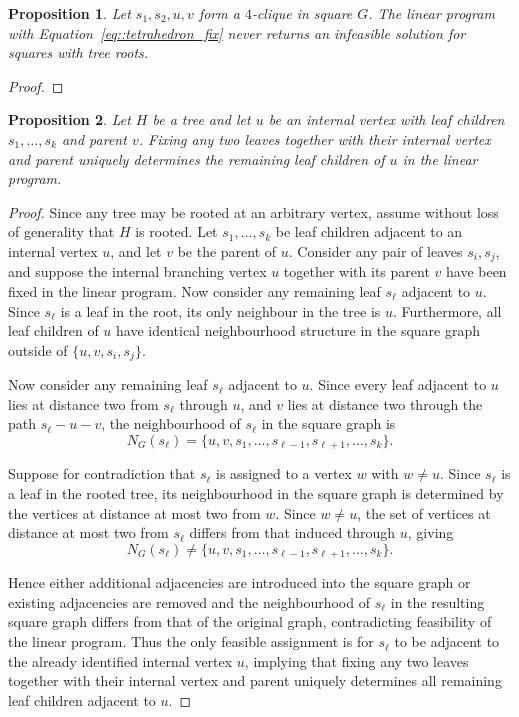 \documentclass[11pt]{article}
\newtheorem{proposition}{Proposition}
\begin{document}
\begin{proposition} \label{prop::tetrahedron_decomposition_feasibility}
  Let $s_1,s_2,u,v$ form a $4$-clique in square $G$. The linear program with Equation~\eqref{eq::tetrahedron_fix} never returns an infeasible solution for squares with tree roots. 
\end{proposition}
\begin{proof}
  
\end{proof}

\begin{proposition} \label{prop::tetrahedron_fixing}
  Let $H$ be a tree and let $u$ be an internal vertex with leaf children $s_1,\dots,s_k$ and parent $v$. Fixing any two leaves together with their internal vertex and parent uniquely determines the remaining leaf children of $u$ in the linear program.
\end{proposition}
\begin{proof}
  Since any tree may be rooted at an arbitrary vertex, assume without loss of generality that $H$ is rooted. Let $s_1,\dots,s_k$ be leaf children adjacent to an internal vertex $u$, and let $v$ be the parent of $u$. Consider any pair of leaves $s_i,s_j$, and suppose the internal branching vertex $u$ together with its parent $v$ have been fixed in the linear program. Now consider any remaining leaf $s_\ell$ adjacent to $u$. Since $s_\ell$ is a leaf in the root, its only neighbour in the tree is $u$. Furthermore, all leaf children of $u$ have identical neighbourhood structure in the square graph outside of $\{u,v,s_i,s_j\}$.

  Now consider any remaining leaf $s_\ell$ adjacent to $u$. Since every leaf adjacent to $u$ lies at distance two from $s_\ell$ through $u$, and $v$ lies at distance two through the path $s_\ell-u-v$, the neighbourhood of $s_\ell$ in the square graph is
  \[
  N_G(s_\ell) = \{u,v,s_1,\dots,s_{\ell-1},s_{\ell+1},\dots,s_k\}.
  \]

  Suppose for contradiction that $s_\ell$ is assigned to a vertex $w$ with $w\neq u$. Since $s_\ell$ is a leaf in the rooted tree, its neighbourhood in the square graph is determined by the vertices at distance at most two from $w$. Since $w\neq u$, the set of vertices at distance at most two from $s_\ell$ differs from that induced through $u$, giving
  \[
  N_G(s_\ell)
  \neq
  \{u,v,s_1,\dots,s_{\ell-1},s_{\ell+1},\dots,s_k\}.
  \]

  Hence either additional adjacencies are introduced into the square graph or existing adjacencies are removed and the neighbourhood of $s_\ell$ in the resulting square graph differs from that of the original graph, contradicting feasibility of the linear program. Thus the only feasible assignment is for $s_\ell$ to be adjacent to the already identified internal vertex $u$, implying that fixing any two leaves together with their internal vertex and parent uniquely determines all remaining leaf children adjacent to $u$.
\end{proof}
\end{document}
